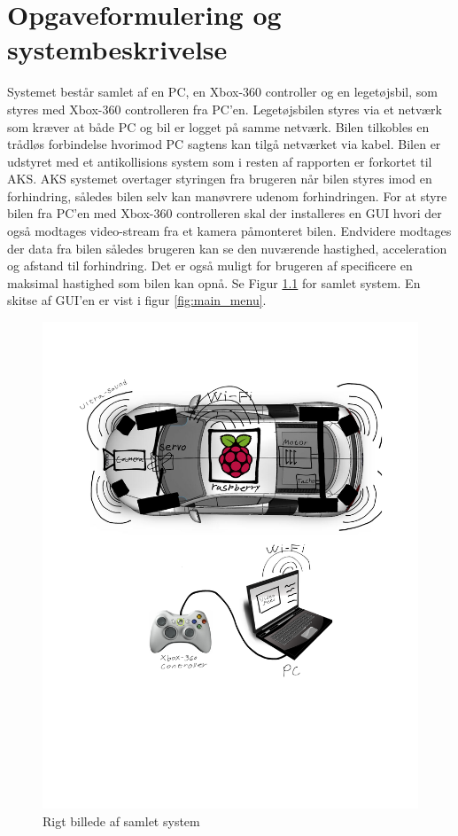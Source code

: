 \chapter{Opgaveformulering og systembeskrivelse} \label{ch:Systembeskrivelse} %
Systemet består samlet af en PC, en Xbox-360 controller og en legetøjsbil, som styres med Xbox-360 controlleren fra PC'en. Legetøjsbilen styres via et netværk som kræver at både PC og bil er logget på samme netværk. Bilen tilkobles en trådløs forbindelse hvorimod PC sagtens kan tilgå netværket via kabel. Bilen er udstyret med et antikollisions system som i resten af rapporten er forkortet til AKS. AKS systemet overtager styringen fra brugeren når bilen styres imod en forhindring, således bilen selv kan manøvrere udenom forhindringen. For at styre bilen fra PC'en med Xbox-360 controlleren skal der installeres en GUI hvori der også modtages video-stream fra et kamera påmonteret bilen. Endvidere modtages der data fra bilen således brugeren kan se den nuværende hastighed, acceleration og afstand til forhindring. Det er også muligt for brugeren af specificere en maksimal hastighed som bilen kan opnå. Se Figur \ref{fig:rigbillede} for samlet system. En skitse af GUI'en er vist i figur \ref{fig:main_menu}.
\begin{figure}[H]
\centering
\includegraphics[width=\textwidth - 7.38 cm]{../fig/billeder/rigbillede}
\caption{Rigt billede af samlet system}
\label{fig:rigbillede}
\end{figure} 
